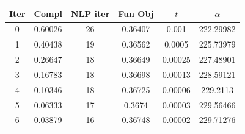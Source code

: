 \begin{tabular}{c c c c c c}
\toprule
Iter & Compl & NLP iter & Fun Obj & $t$ & $\alpha$ \\
\midrule
0 & 0.60026 & 26 & 0.36407 & 0.001 & 222.29982 \\
1 & 0.40438 & 19 & 0.36562 & 0.0005 & 225.73979 \\
2 & 0.26647 & 18 & 0.36649 & 0.00025 & 227.48901 \\
3 & 0.16783 & 18 & 0.36698 & 0.00013 & 228.59121 \\
4 & 0.10346 & 18 & 0.36725 & 0.00006 & 229.2113 \\
5 & 0.06333 & 17 & 0.3674 & 0.00003 & 229.56466 \\
6 & 0.03879 & 16 & 0.36748 & 0.00002 & 229.71276 \\
\bottomrule
\end{tabular}